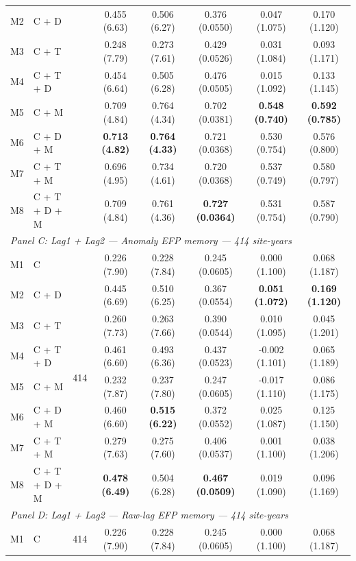 \begin{table}[htbp]
\begin{tabular}{llcccccc}
M2 & C + D &  & 0.455 (6.63) & 0.506 (6.27) & 0.376 (0.0550) & 0.047 (1.075) & 0.170 (1.120) \\
M3 & C + T &  & 0.248 (7.79) & 0.273 (7.61) & 0.429 (0.0526) & 0.031 (1.084) & 0.093 (1.171) \\
M4 & C + T + D &  & 0.454 (6.64) & 0.505 (6.28) & 0.476 (0.0505) & 0.015 (1.092) & 0.133 (1.145) \\
M5 & C + M &  & 0.709 (4.84) & 0.764 (4.34) & 0.702 (0.0381) & \textbf{0.548 (0.740)} & \textbf{0.592 (0.785)} \\
M6 & C + D + M &  & \textbf{0.713 (4.82)} & \textbf{0.764 (4.33)} & 0.721 (0.0368) & 0.530 (0.754) & 0.576 (0.800) \\
M7 & C + T + M &  & 0.696 (4.95) & 0.734 (4.61) & 0.720 (0.0368) & 0.537 (0.749) & 0.580 (0.797) \\
M8 & C + T + D + M &  & 0.709 (4.84) & 0.761 (4.36) & \textbf{0.727 (0.0364)} & 0.531 (0.754) & 0.587 (0.790) \\
\midrule
\multicolumn{8}{l}{\textit{Panel C: Lag1 + Lag2 --- Anomaly EFP memory --- 414 site-years}} \\
\midrule
M1 & C & \multirow{8}{*}{414} & 0.226 (7.90) & 0.228 (7.84) & 0.245 (0.0605) & 0.000 (1.100) & 0.068 (1.187) \\
M2 & C + D &  & 0.445 (6.69) & 0.510 (6.25) & 0.367 (0.0554) & \textbf{0.051 (1.072)} & \textbf{0.169 (1.120)} \\
M3 & C + T &  & 0.260 (7.73) & 0.263 (7.66) & 0.390 (0.0544) & 0.010 (1.095) & 0.045 (1.201) \\
M4 & C + T + D &  & 0.461 (6.60) & 0.493 (6.36) & 0.437 (0.0523) & -0.002 (1.101) & 0.065 (1.189) \\
M5 & C + M &  & 0.232 (7.87) & 0.237 (7.80) & 0.247 (0.0605) & -0.017 (1.110) & 0.086 (1.175) \\
M6 & C + D + M &  & 0.460 (6.60) & \textbf{0.515 (6.22)} & 0.372 (0.0552) & 0.025 (1.087) & 0.125 (1.150) \\
M7 & C + T + M &  & 0.279 (7.63) & 0.275 (7.60) & 0.406 (0.0537) & 0.001 (1.100) & 0.038 (1.206) \\
M8 & C + T + D + M &  & \textbf{0.478 (6.49)} & 0.504 (6.28) & \textbf{0.467 (0.0509)} & 0.019 (1.090) & 0.096 (1.169) \\
\midrule
\multicolumn{8}{l}{\textit{Panel D: Lag1 + Lag2 --- Raw-lag EFP memory --- 414 site-years}} \\
\midrule
M1 & C & \multirow{8}{*}{414} & 0.226 (7.90) & 0.228 (7.84) & 0.245 (0.0605) & 0.000 (1.100) & 0.068 (1.187) \\

\end{tabular}
\end{table}
